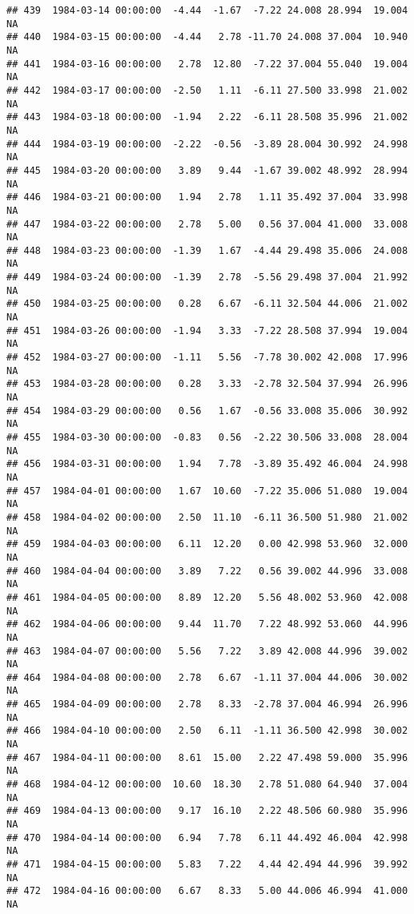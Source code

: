 \documentclass{article}\usepackage{graphicx, color}
\makeatletter
\newenvironment{kframe}{%
 \def\at@end@of@kframe{}%
 \ifinner\ifhmode%
  \def\at@end@of@kframe{\end{minipage}}%
  \begin{minipage}{\columnwidth}%
 \fi\fi%
 \def\FrameCommand##1{\hskip\@totalleftmargin \hskip-\fboxsep
 \colorbox{shadecolor}{##1}\hskip-\fboxsep
     \hskip-\linewidth \hskip-\@totalleftmargin \hskip\columnwidth}%
 \MakeFramed {\advance\hsize-\width
   \@totalleftmargin\z@ \linewidth\hsize
   \@setminipage}}%
 {\par\unskip\endMakeFramed%
 \at@end@of@kframe}
\newenvironment{knitrout}{}{} %
\makeatother
\begin{document}
\begin{knitrout}
\begin{kframe}
\begin{verbatim}
## 439  1984-03-14 00:00:00  -4.44  -1.67  -7.22 24.008 28.994  19.004     NA
## 440  1984-03-15 00:00:00  -4.44   2.78 -11.70 24.008 37.004  10.940     NA
## 441  1984-03-16 00:00:00   2.78  12.80  -7.22 37.004 55.040  19.004     NA
## 442  1984-03-17 00:00:00  -2.50   1.11  -6.11 27.500 33.998  21.002     NA
## 443  1984-03-18 00:00:00  -1.94   2.22  -6.11 28.508 35.996  21.002     NA
## 444  1984-03-19 00:00:00  -2.22  -0.56  -3.89 28.004 30.992  24.998     NA
## 445  1984-03-20 00:00:00   3.89   9.44  -1.67 39.002 48.992  28.994     NA
## 446  1984-03-21 00:00:00   1.94   2.78   1.11 35.492 37.004  33.998     NA
## 447  1984-03-22 00:00:00   2.78   5.00   0.56 37.004 41.000  33.008     NA
## 448  1984-03-23 00:00:00  -1.39   1.67  -4.44 29.498 35.006  24.008     NA
## 449  1984-03-24 00:00:00  -1.39   2.78  -5.56 29.498 37.004  21.992     NA
## 450  1984-03-25 00:00:00   0.28   6.67  -6.11 32.504 44.006  21.002     NA
## 451  1984-03-26 00:00:00  -1.94   3.33  -7.22 28.508 37.994  19.004     NA
## 452  1984-03-27 00:00:00  -1.11   5.56  -7.78 30.002 42.008  17.996     NA
## 453  1984-03-28 00:00:00   0.28   3.33  -2.78 32.504 37.994  26.996     NA
## 454  1984-03-29 00:00:00   0.56   1.67  -0.56 33.008 35.006  30.992     NA
## 455  1984-03-30 00:00:00  -0.83   0.56  -2.22 30.506 33.008  28.004     NA
## 456  1984-03-31 00:00:00   1.94   7.78  -3.89 35.492 46.004  24.998     NA
## 457  1984-04-01 00:00:00   1.67  10.60  -7.22 35.006 51.080  19.004     NA
## 458  1984-04-02 00:00:00   2.50  11.10  -6.11 36.500 51.980  21.002     NA
## 459  1984-04-03 00:00:00   6.11  12.20   0.00 42.998 53.960  32.000     NA
## 460  1984-04-04 00:00:00   3.89   7.22   0.56 39.002 44.996  33.008     NA
## 461  1984-04-05 00:00:00   8.89  12.20   5.56 48.002 53.960  42.008     NA
## 462  1984-04-06 00:00:00   9.44  11.70   7.22 48.992 53.060  44.996     NA
## 463  1984-04-07 00:00:00   5.56   7.22   3.89 42.008 44.996  39.002     NA
## 464  1984-04-08 00:00:00   2.78   6.67  -1.11 37.004 44.006  30.002     NA
## 465  1984-04-09 00:00:00   2.78   8.33  -2.78 37.004 46.994  26.996     NA
## 466  1984-04-10 00:00:00   2.50   6.11  -1.11 36.500 42.998  30.002     NA
## 467  1984-04-11 00:00:00   8.61  15.00   2.22 47.498 59.000  35.996     NA
## 468  1984-04-12 00:00:00  10.60  18.30   2.78 51.080 64.940  37.004     NA
## 469  1984-04-13 00:00:00   9.17  16.10   2.22 48.506 60.980  35.996     NA
## 470  1984-04-14 00:00:00   6.94   7.78   6.11 44.492 46.004  42.998     NA
## 471  1984-04-15 00:00:00   5.83   7.22   4.44 42.494 44.996  39.992     NA
## 472  1984-04-16 00:00:00   6.67   8.33   5.00 44.006 46.994  41.000     NA

\end{verbatim}
\end{kframe}
\end{knitrout}
\end{document}
